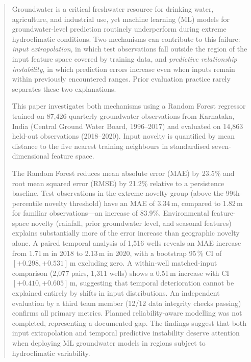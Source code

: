 \documentclass[conference]{IEEEtran}
\begin{document}
\begin{abstract}
Groundwater is a critical freshwater resource for drinking water,
agriculture, and industrial use, yet machine learning (ML) models for
groundwater-level prediction routinely underperform during extreme
hydroclimatic conditions.
Two mechanisms can contribute to this failure: \emph{input extrapolation},
in which test observations fall outside the region of the input feature
space covered by training data, and \emph{predictive relationship
instability}, in which prediction errors increase even when inputs remain
within previously encountered ranges.
Prior evaluation practice rarely separates these two explanations.

This paper investigates both mechanisms using a Random Forest regressor
trained on 87{,}426 quarterly groundwater observations from Karnataka,
India (Central Ground Water Board, 1996--2017) and evaluated on 14{,}863
held-out observations (2018--2020).
Input novelty is quantified by mean distance to the five nearest training
neighbours in standardised seven-dimensional feature space.

The Random Forest reduces mean absolute error (MAE) by 23.5\% and root
mean squared error (RMSE) by 21.2\% relative to a persistence baseline.
Test observations in the extreme-novelty group (above the 99th-percentile
novelty threshold) have an MAE of 3.34\,m, compared to 1.82\,m for
familiar observations---an increase of 83.9\%.
Environmental feature-space novelty (rainfall, prior groundwater level,
and seasonal features) explains substantially more of the error increase
than geographic novelty alone.
A paired temporal analysis of 1{,}516 wells reveals an MAE increase from
1.71\,m in 2018 to 2.13\,m in 2020, with a bootstrap 95\,\% CI of
$[+0.298, +0.531]$\,m excluding zero.
A within-well matched-input comparison (2{,}077 pairs, 1{,}311 wells)
shows a 0.51\,m increase with CI $[+0.410, +0.605]$\,m, suggesting that
temporal deterioration cannot be explained entirely by shifts in input
distributions.
An independent evaluation by a third team member (12/12 data integrity
checks passing) confirms all primary metrics.
Planned reliability-aware modelling was not completed, representing a
documented gap.
The findings suggest that both input extrapolation and temporal predictive
instability deserve attention when deploying ML groundwater models in
regions subject to hydroclimatic variability.
\end{abstract}
\end{document}
